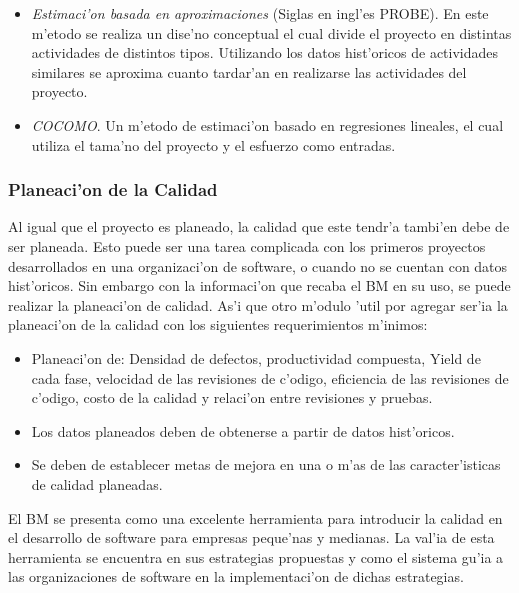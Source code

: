 \begin{itemize}
	\item \emph{Estimaci'on basada en aproximaciones} (Siglas en ingl'es PROBE). En este m'etodo se realiza un dise'no conceptual el cual divide el proyecto en distintas actividades de distintos tipos. Utilizando los datos hist'oricos de actividades similares se aproxima cuanto tardar'an en realizarse las actividades del proyecto\cite{Humphrey}.
	\item \emph{COCOMO}. Un m'etodo de estimaci'on basado en regresiones lineales, el cual utiliza el tama'no del proyecto y el esfuerzo como entradas\cite{Chulani1999}.
\end{itemize}

\subsubsection{Planeaci'on de la Calidad}
\label{sec:Planeaci'ondelaCalidad}
\noindent
Al igual que el proyecto es planeado, la calidad que este tendr'a tambi'en debe de ser planeada. Esto puede ser una tarea complicada con los primeros proyectos desarrollados en una organizaci'on de software, o cuando no se cuentan con datos hist'oricos. Sin embargo con la informaci'on que recaba el BM en su uso, se puede realizar la planeaci'on de calidad. As'i que otro m'odulo 'util por agregar ser'ia la planeaci'on de la calidad con los siguientes requerimientos m'inimos:

\begin{itemize}
	\item Planeaci'on de: Densidad de defectos, productividad compuesta, Yield de cada fase, velocidad de las revisiones de c'odigo, eficiencia de las revisiones de c'odigo, costo de la calidad y relaci'on entre revisiones y pruebas.
	\item Los datos planeados deben de obtenerse a partir de datos hist'oricos.
	\item Se deben de establecer metas de mejora en una o m'as de las caracter'isticas de calidad planeadas.
\end{itemize}

El BM se presenta como una excelente herramienta para introducir la calidad en el desarrollo de software para empresas peque'nas y medianas. La val'ia de esta herramienta se encuentra en sus estrategias propuestas y como el sistema gu'ia a las organizaciones de software en la implementaci'on de dichas estrategias.

\clearpage